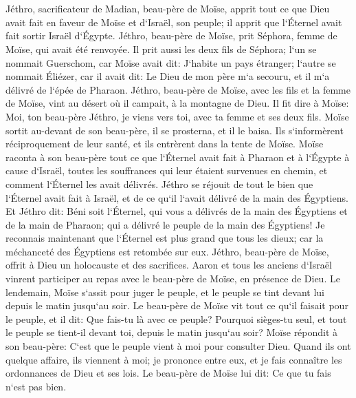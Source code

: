 \chapter{}

\verse Jéthro, sacrificateur de Madian, beau-père de Moïse, apprit tout ce que Dieu avait fait en faveur de Moïse et d`Israël, son peuple; il apprit que l`Éternel avait fait sortir Israël d`Égypte. 
\verse Jéthro, beau-père de Moïse, prit Séphora, femme de Moïse, qui avait été renvoyée. 
\verse Il prit aussi les deux fils de Séphora; l`un se nommait Guerschom, car Moïse avait dit: J`habite un pays étranger; 
\verse l`autre se nommait Éliézer, car il avait dit: Le Dieu de mon père m`a secouru, et il m`a délivré de l`épée de Pharaon. 
\verse Jéthro, beau-père de Moïse, avec les fils et la femme de Moïse, vint au désert où il campait, à la montagne de Dieu. 
\verse Il fit dire à Moïse: Moi, ton beau-père Jéthro, je viens vers toi, avec ta femme et ses deux fils. 
\verse Moïse sortit au-devant de son beau-père, il se prosterna, et il le baisa. Ils s`informèrent réciproquement de leur santé, et ils entrèrent dans la tente de Moïse. 
\verse Moïse raconta à son beau-père tout ce que l`Éternel avait fait à Pharaon et à l`Égypte à cause d`Israël, toutes les souffrances qui leur étaient survenues en chemin, et comment l`Éternel les avait délivrés. 
\verse Jéthro se réjouit de tout le bien que l`Éternel avait fait à Israël, et de ce qu`il l`avait délivré de la main des Égyptiens. 
\verse Et Jéthro dit: Béni soit l`Éternel, qui vous a délivrés de la main des Égyptiens et de la main de Pharaon; qui a délivré le peuple de la main des Égyptiens! 
\verse Je reconnais maintenant que l`Éternel est plus grand que tous les dieux; car la méchanceté des Égyptiens est retombée sur eux. 
\verse Jéthro, beau-père de Moïse, offrit à Dieu un holocauste et des sacrifices. Aaron et tous les anciens d`Israël vinrent participer au repas avec le beau-père de Moïse, en présence de Dieu. 
\verse Le lendemain, Moïse s`assit pour juger le peuple, et le peuple se tint devant lui depuis le matin jusqu`au soir. 
\verse Le beau-père de Moïse vit tout ce qu`il faisait pour le peuple, et il dit: Que fais-tu là avec ce peuple? Pourquoi sièges-tu seul, et tout le peuple se tient-il devant toi, depuis le matin jusqu`au soir? 
\verse Moïse répondit à son beau-père: C`est que le peuple vient à moi pour consulter Dieu. 
\verse Quand ils ont quelque affaire, ils viennent à moi; je prononce entre eux, et je fais connaître les ordonnances de Dieu et ses lois. 
\verse Le beau-père de Moïse lui dit: Ce que tu fais n`est pas bien. 
